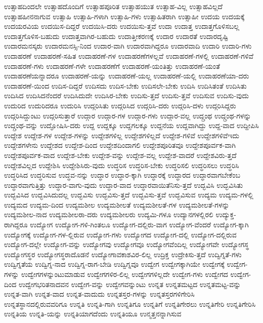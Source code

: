 {ಉತ್ಸಾಹದಿಂದಲೇ
ಉತ್ಸಾಹದೊಂದಿಗೆ
ಉತ್ಸಾಹಪೂರಿತ
ಉತ್ಸಾಹಯುತ
ಉತ್ಸಾಹ-ವಿಲ್ಲ
ಉತ್ಸಾಹವಿಲ್ಲದೆ
ಉತ್ಸಾಹಹೀನನಾಗುವ
ಉತ್ಸಾಹಿ
ಉತ್ಸಾಹಿ-ಗಳಾಗಿ
ಉತ್ಸಾಹಿ-ಗಳು
ಉತ್ಸಾಹಿತರಾಗಿ
ಉತ್ಸಾಹೀ
ಉದಯ
ಉದಯಕ್ಕೆ
ಉದಯರವಿಯ
ಉದಯಿಸ-ದಿದ್ದರೆ
ಉದಯಿಸಿ-ದರು
ಉದಯಿಸು-ತ್ತವೆ
ಉದಾ
ಉದಾತ್ತ
ಉದಾತ್ತಗೊಳಿಸಬಲ್ಲ
ಉದಾತ್ತಗೊಳಿಸ-ಬಹುದು
ಉದಾತ್ತವಾಗಿರ-ಬಹುದು
ಉದಾತ್ತೀಕರಣಕ್ಕೆ
ಉದಾರ
ಉದಾರತೆ
ಉದಾರದೃಷ್ಟಿ
ಉದಾರಮನಸ್ಕರು
ಉದಾರಮನಸ್ಸಿ-ನಿಂದ
ಉದಾರ-ವಾಗಿ
ಉದಾರವಾಗಿದ್ದರೂ
ಉದಾರವಾದಿ
ಉದಾರಿ
ಉದಾರಿ-ಗಳು
ಉದಾಹರಣೆ
ಉದಾಹರಣೆ-ಸಹಿತ
ಉದಾಹರಣೆ-ಗಳ
ಉದಾಹರಣೆಗಳಲ್ಲವೆ
ಉದಾಹರಣೆ-ಗಳಲ್ಲಿ
ಉದಾಹರಣೆ-ಗಳಿವೆ
ಉದಾಹರಣೆ-ಗಳು
ಉದಾಹರಣೆ-ಗಳೇ
ಉದಾಹರಣೆಗೆ
ಉದಾಹರಣೆ-ಯಂತಿತ್ತು
ಉದಾಹರಣೆ-ಯಂತೆ
ಉದಾಹರಣೆಯನ್ನಾದರೂ
ಉದಾಹರಣೆ-ಯನ್ನು
ಉದಾಹರಣೆ-ಯಲ್ಲ
ಉದಾಹರಣೆ-ಯಲ್ಲಿ
ಉದಾಹರಣೆಯಾ-ದರು
ಉದಾಹರಣೆ-ಯಿಂದ
ಉದಿಸ-ದಿದ್ದರೆ
ಉದಿಸದು
ಉದಿಸ-ಬೇಕು
ಉದಿಸಲೇ-ಬೇಕು
ಉದಿಸಿ
ಉದಿಸಿತಂತೆ
ಉದಿಸಿತು
ಉದಿಸಿದ
ಉದಿಸಿದನೆಂದರೆ
ಉದಿಸಿದುದೇ
ಉದಿಸಿರ-ಬೇಕು
ಉದಿಸು-ತ್ತದೆ
ಉದಿಸು-ತ್ತವೆ
ಉದಿಸುವ
ಉದಿಸು-ವುದು
ಉದುರಿದ
ಉದುರಿದರೂ
ಉದುರಿಸಿ
ಉದ್ಗರಿಸಿತು
ಉದ್ಗರಿಸಿದ
ಉದ್ಗರಿಸಿ-ದರು
ಉದ್ಗರಿಸಿ-ದಳು
ಉದ್ಗರಿಸಿದ್ದರು
ಉದ್ಗರಿಸಿದ್ದುಂಟು
ಉದ್ಗರಿಸುತ್ತಾರೆ
ಉದ್ಗಾರ
ಉದ್ಗಾರ-ಗಳ
ಉದ್ಗಾರ-ಗಳು
ಉದ್ಗಾರ-ವಲ್ಲ
ಉದ್ಗ್ರಂಥ
ಉದ್ಗ್ರಂಥ-ಗಳನ್ನು
ಉದ್ಗ್ರಂಥ-ವನ್ನು
ಉದ್ಘೋಷಿಸಿ-ದರು
ಉದ್ದ
ಉದ್ದಕ್ಕೂ
ಉದ್ದಗಲಕ್ಕೂ
ಉದ್ದನೆಯ
ಉದ್ದವಾಗಿದ್ದು
ಉದ್ದ-ವಾದ
ಉದ್ದೀಪಿಸಿ
ಉದ್ದೇಶ
ಉದ್ದೇಶ-ಗಳ
ಉದ್ದೇಶ-ಗಳನ್ನು
ಉದ್ದೇಶಗಳಿಲ್ಲ
ಉದ್ದೇಶಗಳಿಲ್ಲದೆ
ಉದ್ದೇಶ-ಗಳಿವೆ
ಉದ್ದೇಶಗಳಿವೆಇದು
ಉದ್ದೇಶಗಳೇನು
ಉದ್ದೇಶದ
ಉದ್ದೇಶ-ದಿಂದ
ಉದ್ದೇಶದಿಂದಾಗಲಿ
ಉದ್ದೇಶಪೂರಿತವೂ
ಉದ್ದೇಶಪೂರ್ವಕ-ವಾಗಿ
ಉದ್ದೇಶಪೂರ್ವಕ-ವಾದ
ಉದ್ದೇಶ-ಬೇಕು
ಉದ್ದೇಶ-ವನ್ನು
ಉದ್ದೇಶ-ವಲ್ಲ
ಉದ್ದೇಶ-ವಾದರೆ
ಉದ್ದೇಶವಿರು-ತ್ತದೆ
ಉದ್ದೇಶವಿಲ್ಲದ
ಉದ್ದೇಶಿಸಿ
ಉದ್ದೇಶಿಸಿರು-ವುದು
ಉದ್ಧರಿಸ
ಉದ್ಧರಿಸ-ಬೇಕು
ಉದ್ಧರಿಸಲಿ
ಉದ್ಧರಿಸಲು
ಉದ್ಧರಿಸಿ
ಉದ್ಧರಿಸಿದ
ಉದ್ಧರಿಸುವ
ಉದ್ಧವ-ನನ್ನು
ಉದ್ಧಾರ
ಉದ್ಧಾರ-ಕ್ಕಾಗಿ
ಉದ್ಧಾರಕ್ಕೆ
ಉದ್ಧಾರದ
ಉದ್ಧಾರವಾಗಬೇಕೆಂಬ
ಉದ್ಧಾರವಾಗುತ್ತಿತ್ತು
ಉದ್ಧಾರ-ವಾಗು-ವುದು
ಉದ್ಧಾರ-ವಾದ
ಉದ್ಧಾರವಾಯಿತೆನಿಸು-ತ್ತದೆ
ಉದ್ಭವಿಸಿ
ಉದ್ಭವಿಸಿತು
ಉದ್ಭವಿಸಿದ
ಉದ್ಭವಿಸಿದುದಲ್ಲ
ಉದ್ಭವಿಸು
ಉದ್ಭವಿಸು-ತ್ತದೆ
ಉದ್ಭವಿಸು-ತ್ತವೆ
ಉದ್ಭವಿಸುವ
ಉದ್ಯಮ
ಉದ್ಯಮ-ಗಳಲ್ಲಿ
ಉದ್ಯಮದ
ಉದ್ಯಮ-ದಿಂದ
ಉದ್ಯಮಶೀಲ
ಉದ್ಯಮಶೀಲತೆ
ಉದ್ಯಮಶೀಲತೆ-ಗಳ
ಉದ್ಯಮಶೀಲತೆ-ಗಳನ್ನು
ಉದ್ಯಮಶೀಲ-ನಾದ
ಉದ್ಯಮಶೀಲರಾ-ದರು
ಉದ್ಯಮಶೀಲರು
ಉದ್ಯಮಿ-ಗಳೂ
ಉದ್ಯಾನಗಳಲ್ಲಿರಲಿ
ಉದ್ಯುಕ್ತ-ರಾಗಿದ್ದರೂ
ಉದ್ಯೋಗ
ಉದ್ಯೋಗ-ಗಳಿ-ಗಿಂತಲೂ
ಉದ್ಯೋಗ-ದಲ್ಲಿರು-ವಾಗ
ಉದ್ಯೋಗ-ವೆಂದರೆ
ಉದ್ಯೋಗ-ಕ್ಕಾಗಿ
ಉದ್ಯೋಗಕ್ಕೆ
ಉದ್ಯೋಗ-ಗಳ-ಲ್ಲಿರುವ
ಉದ್ಯೋಗ-ಗಳು
ಉದ್ಯೋಗದ
ಉದ್ಯೋಗ-ದಲ್ಲಿ
ಉದ್ಯೋಗ-ದಲ್ಲಿರುವ
ಉದ್ಯೋಗ-ದಲ್ಲೇ
ಉದ್ಯೋಗ-ವನ್ನು
ಉದ್ಯೋಗವು
ಉದ್ಯೋಗವೂ
ಉದ್ಯೋಗವೆಂದಿಲ್ಲ
ಉದ್ಯೋಗವೇ
ಉದ್ಯೋಗಸ್ಥ
ಉದ್ಯೋಗಸ್ಥರ
ಉದ್ಯೋಗಸ್ಥರಾದೊಡನೆ
ಉದ್ಯೋಗಾವಕಾಶವಿರ-ಲಿಲ್ಲ
ಉದ್ರಿಕ್ತ
ಉದ್ರೇಕಿಸು-ತ್ತದೆ
ಉದ್ವಿಗ್ನತೆ-ಗಳು
ಉದ್ವಿಗ್ನತೆಯ
ಉದ್ವಿಗ್ನ-ನಾದ
ಉದ್ವಿಗ್ನ-ರಾಗ-ಬೇಡಿ
ಉದ್ವಿಗ್ನವೂ
ಉದ್ವೇಗ
ಉದ್ವೇಗಕ್ಕಾಗಿಯೇ
ಉದ್ವೇಗಕ್ಕೆ
ಉದ್ವೇಗ-ಗಳನ್ನು
ಉದ್ವೇಗಗಳನ್ನುಂಟುಮಾಡುವ
ಉದ್ವೇಗಗಳಿರ-ಲಿಲ್ಲ
ಉದ್ವೇಗಗಳಿಲ್ಲದೇ
ಉದ್ವೇಗ-ಗಳು
ಉದ್ವೇಗದ
ಉದ್ವೇಗ-ದಿಂದ
ಉದ್ವೇಗಭರಿತನಾದವನ
ಉದ್ವೇಗ-ವನ್ನು
ಉದ್ವೇಗವನ್ನುಂಟು
ಉನ್ನತ
ಉನ್ನತಮಟ್ಟದ
ಉನ್ನತಮಟ್ಟ-ವನ್ನು
ಉನ್ನತ-ವಾಗಿ
ಉನ್ನತ-ವಾದ
ಉನ್ನತ-ವಾದುದು
ಉನ್ನತಸ್ತರ-ಗಳನ್ನು
ಉನ್ನತಸ್ತರಗಳಿಗೇರಿಸಿ
ಉನ್ನತಸ್ಥಾನದಲ್ಲಿರುವವರಿಗೂ
ಉನ್ನತಿ
ಉನ್ನತಿ-ಗಾಗಿ
ಉನ್ನತಿಗೂ
ಉನ್ನತಿಗೆ
ಉನ್ನತಿಗೇರಲು
ಉನ್ನತಿಗೇರಿ
ಉನ್ನತಿಗೇರಿಸಿ
ಉನ್ನತಿಯ
ಉನ್ನತಿ-ಯನ್ನು
ಉನ್ನತಿಯಾಗದೆಂದು
ಉನ್ನತಿಯೂ
ಉನ್ಮತ್ತನನ್ನಾಗಿಸುವ
}
